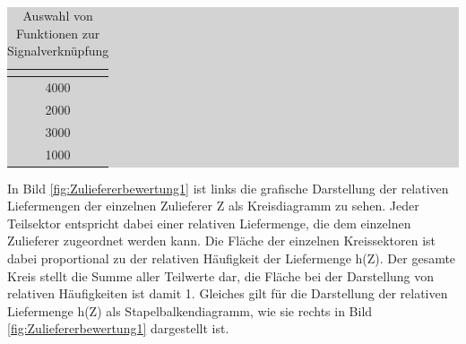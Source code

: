 \begin{table}[H]
\caption{Auswahl von Funktionen zur Signalverknüpfung}
\setlength{\fboxsep}{0pt}%
\colorbox{lightgray}{%
%
\begin{tabular}{| c | c | c |}
\hline
\parbox[c][0.5in][c]{2.2in}{\smallskip\centering\textbf{\selectfont{Zulieferer\\ Z}}} & 
\parbox[c][0.5in][c]{2.2in}{\smallskip\centering\textbf{}} &
\parbox[c][0.5in][c]{2.2in}{\smallskip\centering\textbf{\selectfont{Relative\\ Liefermenge h(Z)}}} \\ \hline

\parbox[c][0.3in][c]{2.2in}{} &
\parbox[c][0.3in][c]{2.2in}{\centerline{4000}} &
\parbox[c][0.3in][c]{2.2in}{} \\ \hline

\parbox[c][0.3in][c]{2.2in}{} &
\parbox[c][0.3in][c]{2.2in}{\centerline{2000}} &
\parbox[c][0.3in][c]{2.2in}{} \\ \hline

\parbox[c][0.3in][c]{2.2in}{} &
\parbox[c][0.3in][c]{2.2in}{\centerline{3000}} &
\parbox[c][0.3in][c]{2.2in}{} \\ \hline

\parbox[c][0.3in][c]{2.2in}{} &
\parbox[c][0.3in][c]{2.2in}{\centerline{1000}} &
\parbox[c][0.3in][c]{2.2in}{} \\ \hline

\end{tabular}%
}\bigskip
\label{tab:threefour}
\end{table}

\noindent In Bild \ref{fig:Zuliefererbewertung1} ist links die grafische Darstellung der relativen Liefermengen der einzelnen Zulieferer Z als Kreisdiagramm zu sehen. Jeder Teilsektor entspricht dabei einer relativen Liefermenge, die dem einzelnen Zulieferer zugeordnet werden kann. Die Fl\"{a}che der einzelnen Kreissektoren ist dabei proportional zu der relativen H\"{a}ufigkeit der Liefermenge h(Z). Der gesamte Kreis stellt die Summe aller Teilwerte dar, die Fl\"{a}che bei der Darstellung von relativen H\"{a}ufigkeiten ist damit 1. Gleiches gilt f\"{u}r die Darstellung der relativen Liefermenge h(Z) als Stapelbalkendiagramm, wie sie rechts in Bild \ref{fig:Zuliefererbewertung1} dargestellt ist.

